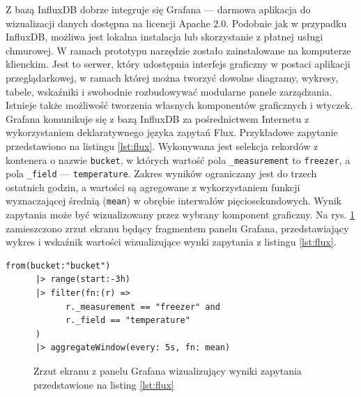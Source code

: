 \documentclass[a4paper, 12pt, twoside]{article}
\begin{document}
Z bazą InfluxDB dobrze integruje się Grafana --- darmowa aplikacja do wizualizacji
danych dostępna na licencji Apache 2.0. Podobnie jak
w przypadku InfluxDB, możliwa jest lokalna instalacja lub skorzystanie z
płatnej usługi chmurowej. W ramach prototypu narzędzie zostało zainstalowane
na komputerze klienckim. Jest to serwer, który udostępnia interfejs graficzny
w postaci aplikacji przeglądarkowej, w ramach której można tworzyć
dowolne diagramy, wykresy, tabele, wskaźniki i swobodnie rozbudowywać
modularne panele zarządzania. Istnieje także możliwość tworzenia własnych komponentów
graficznych i wtyczek.
Grafana komunikuje się z bazą InfluxDB za pośrednictwem Internetu z wykorzystaniem
deklaratywnego języka zapytań Flux. Przykładowe zapytanie przedstawiono na
listingu \ref{lst:flux}. Wykonywana jest selekcja
rekordów z kontenera o nazwie \texttt{bucket}, w których wartość pola
\texttt{\_measurement} to \texttt{freezer}, a pola \texttt{\_field} --- \texttt{temperature}.
Zakres wyników ograniczany jest do trzech ostatnich godzin, a wartości
są agregowane z wykorzystaniem funkcji wyznaczającej średnią (\texttt{mean}) w obrębie interwałów
pięciosekundowych. Wynik zapytania może być wizualizowany przez wybrany komponent
graficzny. Na rys. \ref{fig:grafana-1} zamieszczono zrzut ekranu będący fragmentem panelu Grafana,
przedstawiający wykres i wskaźnik wartości wizualizujące wynki zapytania z listingu \ref{lst:flux}.


\begin{lstlisting}[caption={Przykładowe zapytanie w języku Flux}, label={lst:flux}]
from(bucket:"bucket")
      |> range(start:-3h)
      |> filter(fn:(r) =>
            r._measurement == "freezer" and
            r._field == "temperature"
      )
      |> aggregateWindow(every: 5s, fn: mean)
\end{lstlisting}

\begin{figure}[h]
      \centering
      \caption{Zrzut ekranu z panelu Grafana wizualizujący wyniki zapytania przedstawione na listing \ref{lst:flux}}
      \label{fig:grafana-1}
\end{figure}
\end{document}
